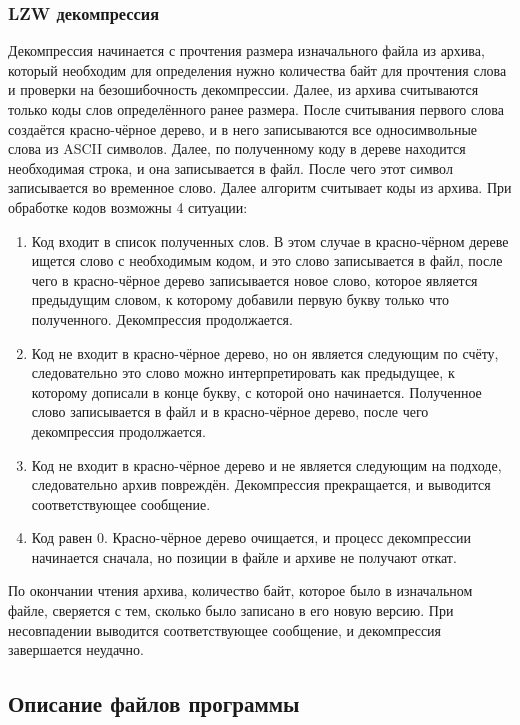 \documentclass[12pt]{article}
\begin{document}
\subsubsection*{LZW декомпрессия}

Декомпрессия начинается с прочтения размера изначального файла из архива, который необходим для определения нужно количества байт для прочтения слова и проверки на безошибочность декомпрессии. Далее, из архива считываются только коды слов определённого ранее размера. После считывания первого слова создаётся красно-чёрное дерево, и в него записываются все односимвольные слова из ASCII символов. Далее, по полученному коду в дереве находится необходимая строка, и она записывается в файл. После чего этот символ записывается во временное слово. Далее алгоритм считывает коды из архива. При обработке кодов возможны 4 ситуации:

\begin{enumerate}
	\item Код входит в список полученных слов. В этом случае в красно-чёрном дереве ищется слово с необходимым кодом, и это слово записывается в файл, после чего в красно-чёрное дерево записывается новое слово, которое является предыдущим словом, к которому добавили первую букву только что полученного. Декомпрессия продолжается.
	\item Код не входит в красно-чёрное дерево, но он является следующим по счёту, следовательно это слово можно интерпретировать как предыдущее, к которому дописали в конце букву, с которой оно начинается. Полученное слово записывается в файл и в красно-чёрное дерево, после чего декомпрессия продолжается.
	\item Код не входит в красно-чёрное дерево и не является следующим на подходе, следовательно архив повреждён. Декомпрессия прекращается, и выводится соответствующее сообщение.
	\item Код равен $0$. Красно-чёрное дерево очищается, и процесс декомпрессии начинается сначала, но позиции в файле и архиве не получают откат.
\end{enumerate}

По окончании чтения архива, количество байт, которое было в изначальном файле, сверяется с тем, сколько было записано в его новую версию. При несовпадении выводится соответствующее сообщение, и декомпрессия завершается неудачно.


\subsection*{Описание файлов программы}
\end{document}
